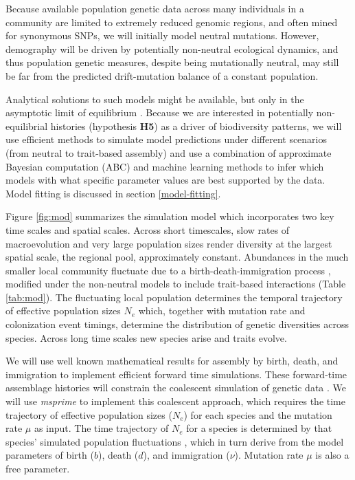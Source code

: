 \documentclass[11pt]{article}
\begin{document}
Because available population genetic data across many individuals in a
community are limited to extremely reduced genomic regions, and often
mined for synonymous SNPs, we will initially model neutral mutations.
However, demography will be driven by potentially non-neutral
ecological dynamics, and thus population genetic measures, despite
being mutationally neutral, may still be far from the predicted
drift-mutation balance of a constant population.

Analytical solutions to such models might be available, but only in
the asymptotic limit of equilibrium \citep[e.g.,][]{Etienne2007-we,
  Rosindell2015-gp}. Because we are interested in potentially
non-equilibrial histories (hypothesis \textbf{H5}) as a driver of
biodiversity patterns, we will use efficient methods to simulate model
predictions under different scenarios (from neutral to trait-based
assembly) and use a combination of approximate Bayesian computation
(ABC) and machine learning methods to infer which models with what
specific parameter values are best supported by the data. Model
fitting is discussed in section \ref{model-fitting}.

Figure \ref{fig:mod} summarizes the simulation model which
incorporates two key time scales and spatial scales. Across short
timescales, slow rates of macroevolution and very large population
sizes render diversity at the largest spatial scale, the regional
pool, approximately constant. Abundances in the much smaller local
community fluctuate due to a birth-death-immigration process
\cite{Kendall1948-ri}, modified under the non-neutral models to
include trait-based interactions (Table \ref{tab:mod}).  The
fluctuating local population determines the temporal trajectory of
effective population sizes $N_e$ which, together with mutation rate
and colonization event timings, determine the distribution of genetic
diversities across species. Across long time scales new species arise
and traits evolve.

We will use well known mathematical results for assembly by birth,
death, and immigration \cite{Haegeman2017-kf,Kendall1948-ri} to
implement efficient forward time simulations.  These forward-time
assemblage histories will constrain the coalescent simulation of
genetic data \cite{Rosenberg2002-vb, waples2007}. We will use {\it
  msprime} \cite{Kelleher2016-an} to implement this coalescent
approach, which requires the time trajectory of effective population
sizes ($N_e$) for each species and the mutation rate $\mu$ as
input. The time trajectory of $N_e$ for a species is determined by
that species' simulated population fluctuations \cite{waples2007},
which in turn derive from the model parameters of birth ($b$), death
($d$), and immigration ($\nu$).  Mutation rate $\mu$ is also a free
parameter.
\end{document}
